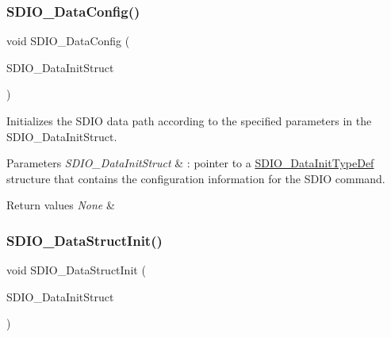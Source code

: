 \subsubsection{\texorpdfstring{SDIO\_DataConfig()}{SDIO\_DataConfig()}}
{\footnotesize\ttfamily void S\+D\+I\+O\+\_\+\+Data\+Config (\begin{DoxyParamCaption}\item[{\mbox{\hyperlink{struct_s_d_i_o___data_init_type_def}{S\+D\+I\+O\+\_\+\+Data\+Init\+Type\+Def}} $\ast$}]{S\+D\+I\+O\+\_\+\+Data\+Init\+Struct }\end{DoxyParamCaption})}



Initializes the S\+D\+IO data path according to the specified parameters in the S\+D\+I\+O\+\_\+\+Data\+Init\+Struct. 


\begin{DoxyParams}{Parameters}
{\em S\+D\+I\+O\+\_\+\+Data\+Init\+Struct} & \+: pointer to a \mbox{\hyperlink{struct_s_d_i_o___data_init_type_def}{S\+D\+I\+O\+\_\+\+Data\+Init\+Type\+Def}} structure that contains the configuration information for the S\+D\+IO command. \\
\hline
\end{DoxyParams}

\begin{DoxyRetVals}{Return values}
{\em None} & \\
\hline
\end{DoxyRetVals}
\mbox{\label{group___s_d_i_o___private___functions_gaa83209c09e921521aca2587fb5b22ea2}} 
\subsubsection{\texorpdfstring{SDIO\_DataStructInit()}{SDIO\_DataStructInit()}}
{\footnotesize\ttfamily void S\+D\+I\+O\+\_\+\+Data\+Struct\+Init (\begin{DoxyParamCaption}\item[{\mbox{\hyperlink{struct_s_d_i_o___data_init_type_def}{S\+D\+I\+O\+\_\+\+Data\+Init\+Type\+Def}} $\ast$}]{S\+D\+I\+O\+\_\+\+Data\+Init\+Struct }\end{DoxyParamCaption})}



